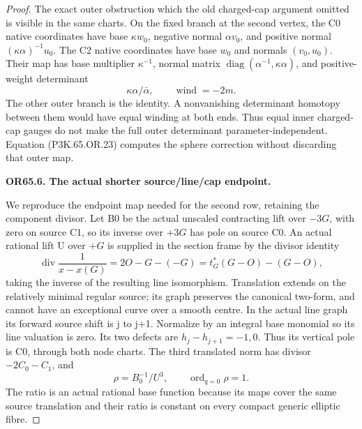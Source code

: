 \begin{proof}
The exact outer obstruction which the old charged-cap argument
omitted is visible in the same charts. On the fixed branch at
the second vertex, the C0 native coordinates have base
\(\kappa w_0\), negative normal \(\alpha v_0\), and positive
normal \((\kappa\alpha)^{-1}u_0\). The C2 native coordinates
have base \(w_0\) and normals \((v_0,u_0)\). Their map has
base multiplier \(\kappa^{-1}\), normal matrix
\(\operatorname{diag}(\alpha^{-1},\kappa\alpha)\), and
positive-weight determinant
\[
                  \kappa\alpha/\bar\alpha,
                  \qquad\operatorname{wind}=-2m.    \tag{P3K.65.OR.24}
\]
The other outer branch is the identity. A nonvanishing determinant
homotopy between them would have equal winding at both ends.
Thus equal inner charged-cap gauges do not make the full outer
determinant parameter-independent. Equation (P3K.65.OR.23) computes
the sphere correction without discarding that outer map.

\par\medskip\noindent\textbf{OR65.6. The actual shorter source/line/cap endpoint.}\par\nopagebreak[4]

We reproduce the endpoint map needed for the second row, retaining
the component divisor. Let B0 be the actual unscaled contracting
lift over \(-3G\), with zero on source C1, so its inverse over
\(+3G\) has pole on source C0. An actual rational lift U over
\(+G\) is supplied in the section frame by the divisor identity
\[
 \operatorname{div}\frac1{x-x(G)}=2O-G-(-G)
                 =t_G^*(G-O)-(G-O),
\]
taking the inverse of the resulting line isomorphism. Translation
extends on the relatively minimal regular source; its graph
preserves the canonical two-form, and cannot have an exceptional
curve over a smooth centre. In the actual line graph its forward
source shift is j to j+1. Normalize by an integral base monomial
so its line valuation is zero. Its two defects are
\(h_j-h_{j+1}=-1,0\). Thus its vertical pole is C0, through both
node charts. The third translated norm has divisor
\(-2C_0-C_1\), and
\[
                \rho=B_0^{-1}/U^3,\qquad
                \operatorname{ord}_{q=0}\rho=1.     \tag{P3K.65.OR.25}
\]
The ratio is an actual rational base function because its maps
cover the same source translation and their ratio is constant
on every compact generic elliptic fibre.


\end{proof}
